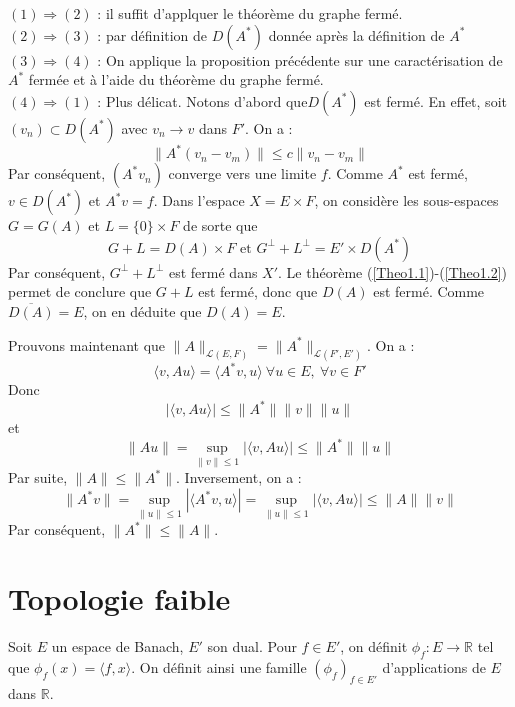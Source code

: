 \begin{dem}
$(1)\Rightarrow (2)$ : il suffit d'applquer le théorème du graphe fermé.\\
$(2)\Rightarrow (3)$ : par définition de $D(A^*)$ donnée après la définition de $A^*$\\
$(3)\Rightarrow (4)$ : On applique la proposition précédente sur une caractérisation de $A^*$ fermée et à l'aide du théorème du graphe fermé.\\
$(4)\Rightarrow (1)$ : Plus délicat. Notons d'abord que$D(A^*)$ est fermé. En effet, soit $(v_n)\subset D(A^*)$ avec $v_n\to v$ dans $F'$. On a : 
\[\|A^*(v_n-v_m)\|\leq c\|v_n-v_m\|\]
Par conséquent, $(A^*v_n)$ converge vers une limite $f$. Comme $A^*$ est fermé, $v\in D(A^*)$ et $A^*v=f$. Dans l'espace $X=E\times F$, on considère les sous-espaces $G=G(A)$ et $L=\{0\}\times F$ de sorte que \[G+L=D(A)\times F \text{ et } G^\perp+L^\perp=E'\times D(A^*)\]
Par conséquent, $G^\perp+L^\perp$ est fermé dans $X'$. Le théorème (\ref{Theo1.1})-(\ref{Theo1.2}) permet de conclure que $G+L$ est fermé, donc que $D(A)$ est fermé. Comme $\overline{D(A)}=E$, on en déduite que $D(A)=E$.

\bigskip
Prouvons maintenant que $\|A\|_{\mathcal{L}(E,F)}=\|A^*\|_{\mathcal{L}(F',E')}$. On a : 
	\[\langle v, Au\rangle=\langle A^*v, u\rangle\ \forall u\in E,\ \forall v\in F'\]
Donc \[|\langle v, Au\rangle| \leq \|A^*\|\|v\|\|u\|\] et 
	\[\|Au\|=\sup_{\|v\|\leq 1}|\langle v, Au\rangle| \leq \|A^*\|\|u\|\]
Par suite, $\|A\|\leq \|A^*\|$. Inversement, on a : 
\[\|A^* v\|=\sup_{\|u\|\leq 1}|\langle A^*v, u\rangle|=\sup_{\|u\|\leq 1}|\langle v, Au\rangle|\leq \|A\|\|v\|\]
Par conséquent, $\|A^*\|\leq \|A\|$.
\end{dem}

\section{Topologie faible}
Soit $E$ un espace de Banach, $E'$ son dual. Pour $f\in E'$, on définit $\phi_f:E\to\mathbb{R}$ tel que $\phi_f(x)=\langle f,x\rangle$. On définit ainsi une famille $(\phi_f)_{f\in E'}$ d'applications de $E$ dans $\mathbb{R}$. 

